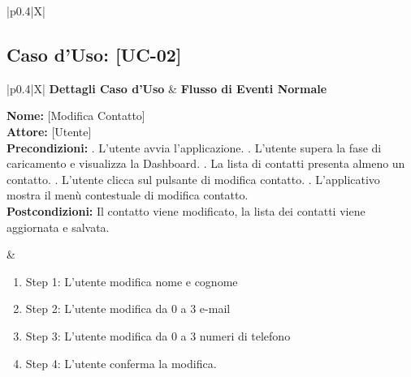 \documentclass[a4paper,12pt]{article}
\begin{document}
\begin{table}[htbp]
\begin{tabularx}{\textwidth}{|p{0.4\textwidth}|X|}
{            } \\
            \hline
        \end{tabularx}
        \caption{Aggiunta Contatto}
    \end{table}
    \newpage
    \subsection*{Caso d'Uso: [UC-02]}

    \begin{table}[htbp]
        \centering
        \begin{tabularx}{\textwidth}{|p{0.4\textwidth}|X|}
            \hline
            \textbf{Dettagli Caso d'Uso} & \textbf{Flusso di Eventi Normale} \\
            \hline
            \parbox[t]{0.38\textwidth}{%
                \textbf{Nome:} [Modifica Contatto] \\[1ex]
                \textbf{Attore:} [Utente] \\[1ex]
                \textbf{Precondizioni:} . L'utente avvia l'applicazione. . L'utente supera la fase di caricamento e visualizza la Dashboard. . La lista di contatti presenta almeno un contatto.  . L'utente clicca sul pulsante di modifica contatto. . L'applicativo mostra il menù contestuale di modifica contatto. \\[1ex]
                \textbf{Postcondizioni:} \newline Il contatto viene modificato, la lista dei contatti viene aggiornata e salvata.\newline
            }
            &
            \parbox[t]{\linewidth}{%
                \begin{enumerate}[noitemsep, leftmargin=*]
                    \item Step 1: L'utente modifica nome e cognome
                    \item Step 2: L'utente modifica da 0 a 3 e-mail
                    \item Step 3: L'utente modifica da 0 a 3 numeri di telefono
                    \item Step 4: L'utente conferma la modifica.
                \end{enumerate}
            } \\
            \hline
\end{tabularx}
\end{table}
\end{document}

